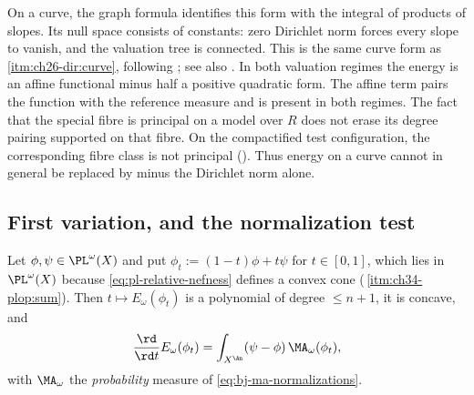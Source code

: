 \begin{remark}
\label{rem:ch46-thuillier}
On a curve, the graph formula identifies this form with the integral
of products of slopes. Its null space consists of constants: zero
Dirichlet norm forces every slope to vanish, and the valuation tree is
connected. This is the same curve form as
\,\cref{itm:ch26-dir:curve}, following
\cite[\S3.5]{Thu05}; see also .
In both valuation regimes the energy is an affine functional minus half a
positive quadratic form. The affine term pairs the function with the
reference measure and is present in both regimes. The fact that the
special fibre is principal on a model over $R$ does not erase its degree
pairing supported on that fibre. On the compactified test configuration,
the corresponding fibre class is not principal
(). Thus energy on a curve cannot in general
be replaced by minus the Dirichlet norm alone.
\end{remark}

\subsection{First variation, and the normalization test}
\label{sec:ch46-first-variation}

\begin{proposition}
\label{prop:ch46-first-variation-pl}
Let $\phi,\psi\in\PL^{\omega}(X)$ and put
$\phi_t:=(1-t)\phi+t\psi$ for $t\in[0,1]$, which lies in
$\PL^{\omega}(X)$ because
\eqref{eq:pl-relative-nefness} defines a convex cone
(\,\cref{itm:ch34-plop:sum}).  Then
$t\mapsto E_\omega(\phi_t)$ is a polynomial of degree $\le n+1$, it is
concave, and
\[
 \frac{\rd}{\rd t}E_\omega(\phi_t)
 =\int_{X^{\An}}(\psi-\phi)\,\MA_\omega(\phi_t),
\]
with $\MA_\omega$ the \emph{probability} measure of
\eqref{eq:bj-ma-normalizations}.
\end{proposition}


